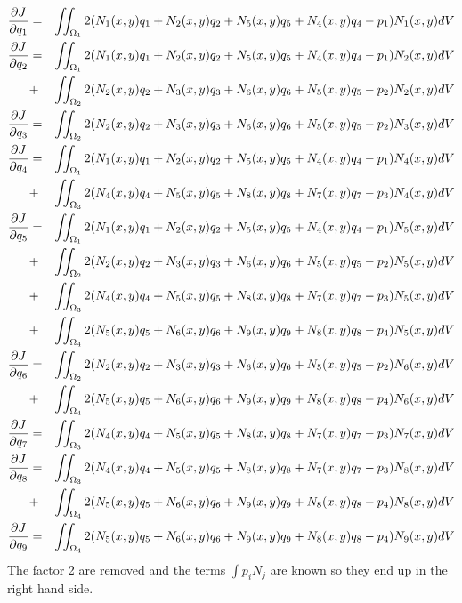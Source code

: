 \begin{eqnarray}
\frac{\partial J}{\partial q_1} 
&=& \iint_{\Omega_1} 2 (N_1(x,y) q_1 + N_2(x,y)q_2 + N_5(x,y)q_5 + N_4(x,y)q_4 -p_1) N_1(x,y) dV \nonumber\\
\frac{\partial J}{\partial q_2}
&=& \iint_{\Omega_1} 2(N_1(x,y) q_1 + N_2(x,y)q_2 + N_5(x,y)q_5 + N_4(x,y)q_4 -p_1) N_2(x,y) dV \nonumber\\
&+& \iint_{\Omega_2} 2(N_2(x,y) q_2 + N_3(x,y)q_3 + N_6(x,y)q_6 + N_5(x,y)q_5 -p_2) N_2(x,y) dV \nonumber\\
\frac{\partial J}{\partial q_3}
&=& \iint_{\Omega_2} 2(N_2(x,y) q_2 + N_3(x,y)q_3 + N_6(x,y)q_6 + N_5(x,y)q_5 -p_2) N_3(x,y) dV \nonumber\\
\frac{\partial J}{\partial q_4}
&=& \iint_{\Omega_1} 2(N_1(x,y) q_1 + N_2(x,y)q_2 + N_5(x,y)q_5 + N_4(x,y)q_4 -p_1) N_4(x,y) dV \nonumber\\
&+& \iint_{\Omega_3} 2(N_4(x,y) q_4 + N_5(x,y)q_5 + N_8(x,y)q_8 + N_7(x,y)q_7 -p_3) N_4(x,y) dV \nonumber\\
\frac{\partial J}{\partial q_5}
&=& \iint_{\Omega_1} 2(N_1(x,y) q_1 + N_2(x,y)q_2 + N_5(x,y)q_5 + N_4(x,y)q_4 -p_1) N_5(x,y) dV \nonumber\\
&+& \iint_{\Omega_2} 2(N_2(x,y) q_2 + N_3(x,y)q_3 + N_6(x,y)q_6 + N_5(x,y)q_5 -p_2) N_5(x,y) dV \nonumber\\
&+& \iint_{\Omega_3} 2(N_4(x,y) q_4 + N_5(x,y)q_5 + N_8(x,y)q_8 + N_7(x,y)q_7 -p_3) N_5(x,y) dV \nonumber\\
&+& \iint_{\Omega_4} 2(N_5(x,y) q_5 + N_6(x,y)q_6 + N_9(x,y)q_9 + N_8(x,y)q_8 -p_4) N_5(x,y) dV \nonumber\\
\frac{\partial J}{\partial q_6}
&=& \iint_{\Omega_2} 2(N_2(x,y) q_2 + N_3(x,y)q_3 + N_6(x,y)q_6 + N_5(x,y)q_5 -p_2) N_6(x,y) dV \nonumber\\
&+& \iint_{\Omega_4} 2(N_5(x,y) q_5 + N_6(x,y)q_6 + N_9(x,y)q_9 + N_8(x,y)q_8 -p_4) N_6(x,y) dV \nonumber\\
\frac{\partial J}{\partial q_7}
&=& \iint_{\Omega_3} 2(N_4(x,y) q_4 + N_5(x,y)q_5 + N_8(x,y)q_8 + N_7(x,y)q_7 -p_3) N_7(x,y) dV \nonumber\\
\frac{\partial J}{\partial q_8}
&=& \iint_{\Omega_3} 2(N_4(x,y) q_4 + N_5(x,y)q_5 + N_8(x,y)q_8 + N_7(x,y)q_7 -p_3) N_8(x,y)dV \nonumber\\
&+& \iint_{\Omega_4} 2(N_5(x,y) q_5 + N_6(x,y)q_6 + N_9(x,y)q_9 + N_8(x,y)q_8 -p_4) N_8(x,y)dV \nonumber\\ 
\frac{\partial J}{\partial q_9}
&=& \iint_{\Omega_4} 2(N_5(x,y) q_5 + N_6(x,y)q_6 + N_9(x,y)q_9 + N_8(x,y)q_8 -p_4) N_9(x,y)dV 
\end{eqnarray}
The factor 2 are removed and the terms $\int p_i N_j $ are known so they end up in the right hand side.

